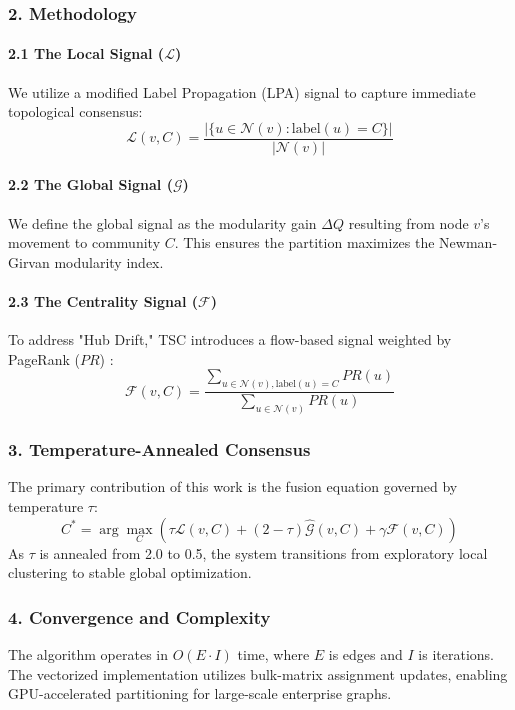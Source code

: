 \subsubsection{2. Methodology}

\paragraph{2.1 The Local Signal ($\mathcal{L}$)}
We utilize a modified Label Propagation (LPA) \cite{raghavan2007lpa} signal to capture immediate topological consensus:
\begin{equation}
\mathcal{L}(v, C) = \frac{|\{u \in \mathcal{N}(v) : \text{label}(u) = C\}|}{|\mathcal{N}(v)|}
\end{equation}

\paragraph{2.2 The Global Signal ($\mathcal{G}$)}
We define the global signal as the modularity gain $\Delta Q$ resulting from node $v$'s movement to community $C$. This ensures the partition maximizes the Newman-Girvan modularity index.

\paragraph{2.3 The Centrality Signal ($\mathcal{F}$)}
To address "Hub Drift," TSC introduces a flow-based signal weighted by PageRank ($PR$) \cite{page1999pagerank}:
\begin{equation}
\mathcal{F}(v, C) = \frac{\sum_{u \in \mathcal{N}(v), \text{label}(u)=C} PR(u)}{\sum_{u \in \mathcal{N}(v)} PR(u)}
\end{equation}

\subsubsection{3. Temperature-Annealed Consensus}
The primary contr\-ibution of this work is the fusion equation governed by temperature $\tau$:
\begin{equation}
C^* = \arg\max_{C} ( \tau \mathcal{L}(v, C) + (2 - \tau) \widehat{\mathcal{G}}(v, C) + \gamma \mathcal{F}(v, C) )
\end{equation}
As $\tau$ is annealed from 2.0 to 0.5, the system transitions from exploratory local clustering to stable global optim\-ization.

\subsubsection{4. Convergence and Complexity}
The algorithm operates in $O(E \cdot I)$ time, where $E$ is edges and $I$ is iterations. The vectorized imple\-mentation utilizes bulk-matrix assignment updates, enabling GPU-accelerated parti\-tioning for large-scale enterprise graphs.

